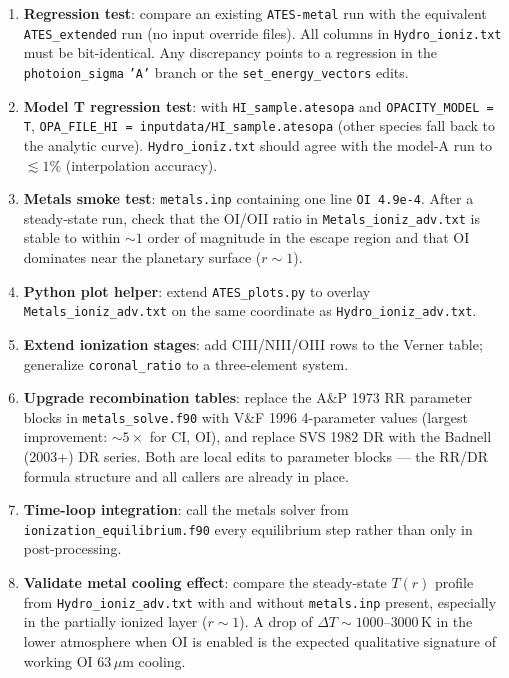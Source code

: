\documentclass[english,a4paper]{kiseon_memo}
\begin{document}
\begin{enumerate}
\item \textbf{Regression test}: compare an existing
\texttt{ATES-metal} run with the equivalent \texttt{ATES\_extended} run
(no input override files). All columns in \texttt{Hydro\_ioniz.txt} must
be bit-identical. Any discrepancy points to a regression in the
\texttt{photoion\_sigma} \texttt{'A'} branch or the
\texttt{set\_energy\_vectors} edits.

\item \textbf{Model T regression test}: with
\texttt{HI\_sample.atesopa} and \texttt{OPACITY\_MODEL = T},
\texttt{OPA\_FILE\_HI = inputdata/HI\_sample.atesopa} (other species fall
back to the analytic curve). \texttt{Hydro\_ioniz.txt} should agree with
the model-A run to $\lesssim 1\%$ (interpolation accuracy).

\item \textbf{Metals smoke test}: \texttt{metals.inp} containing one line
\texttt{OI 4.9e-4}. After a steady-state run, check that the OI/OII ratio
in \texttt{Metals\_ioniz\_adv.txt} is stable to within $\sim 1$ order of
magnitude in the escape region and that OI dominates near the planetary
surface ($r \sim 1$).

\item \textbf{Python plot helper}: extend \texttt{ATES\_plots.py} to overlay
\texttt{Metals\_ioniz\_adv.txt} on the same coordinate as
\texttt{Hydro\_ioniz\_adv.txt}.

\item \textbf{Extend ionization stages}: add CIII/NIII/OIII rows to the
Verner table; generalize \texttt{coronal\_ratio} to a three-element system.

\item \textbf{Upgrade recombination tables}: replace the A\&P 1973 RR
parameter blocks in \texttt{metals\_solve.f90} with V\&F 1996
4-parameter values (largest improvement: $\sim 5\times$ for CI, OI),
and replace SVS 1982 DR with the Badnell (2003+) DR series. Both are
local edits to parameter blocks --- the RR/DR formula structure and
all callers are already in place.

\item \textbf{Time-loop integration}: call the metals solver from
\texttt{ionization\_equilibrium.f90} every equilibrium step rather than
only in post-processing.

\item \textbf{Validate metal cooling effect}: compare the steady-state
$T(r)$ profile from \texttt{Hydro\_ioniz\_adv.txt} with and without
\texttt{metals.inp} present, especially in the partially ionized layer
($r \sim 1$). A drop of $\Delta T \sim 1000$--$3000\,$K in the lower
atmosphere when OI is enabled is the expected qualitative signature
of working OI 63\,$\mu$m cooling.


\end{enumerate}
\end{document}
